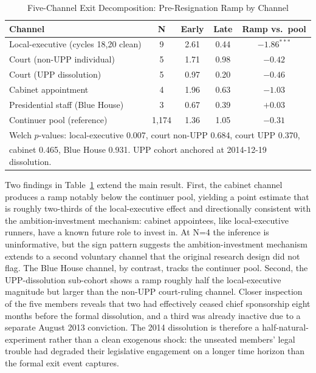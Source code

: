 \documentclass[11pt]{article}
\begin{document}
\begin{table}[H]
\centering
\caption{Five-Channel Exit Decomposition: Pre-Resignation Ramp by Channel}
\label{tab:fivechannel}
\begin{tabular}{lcccc}
\toprule
Channel & N & Early & Late & Ramp vs.\ pool \\
\midrule
Local-executive (cycles 18,20 clean) & 9 & 2.61 & 0.44 & $-1.86^{***}$ \\
Court (non-UPP individual) & 5 & 1.71 & 0.98 & $-0.42$ \\
Court (UPP dissolution) & 5 & 0.97 & 0.20 & $-0.46$ \\
Cabinet appointment & 4 & 1.96 & 0.63 & $-1.03$ \\
Presidential staff (Blue House) & 3 & 0.67 & 0.39 & $+0.03$ \\
\midrule
Continuer pool (reference) & 1{,}174 & 1.36 & 1.05 & $-0.31$ \\
\bottomrule
\multicolumn{5}{l}{\footnotesize Welch $p$-values: local-executive 0.007, court non-UPP 0.684, court UPP 0.370,} \\
\multicolumn{5}{l}{\footnotesize cabinet 0.465, Blue House 0.931. UPP cohort anchored at 2014-12-19 dissolution.} \\
\end{tabular}
\end{table}

Two findings in Table~\ref{tab:fivechannel} extend the main result. First, the cabinet channel produces a ramp notably below the continuer pool, yielding a point estimate that is roughly two-thirds of the local-executive effect and directionally consistent with the ambition-investment mechanism: cabinet appointees, like local-executive runners, have a known future role to invest in. At N=4 the inference is uninformative, but the sign pattern suggests the ambition-investment mechanism extends to a second voluntary channel that the original research design did not flag. The Blue House channel, by contrast, tracks the continuer pool. Second, the UPP-dissolution sub-cohort shows a ramp roughly half the local-executive magnitude but larger than the non-UPP court-ruling channel. Closer inspection of the five members reveals that two had effectively ceased chief sponsorship eight months before the formal dissolution, and a third was already inactive due to a separate August 2013 conviction. The 2014 dissolution is therefore a half-natural-experiment rather than a clean exogenous shock: the unseated members' legal trouble had degraded their legislative engagement on a longer time horizon than the formal exit event captures.
\end{document}

